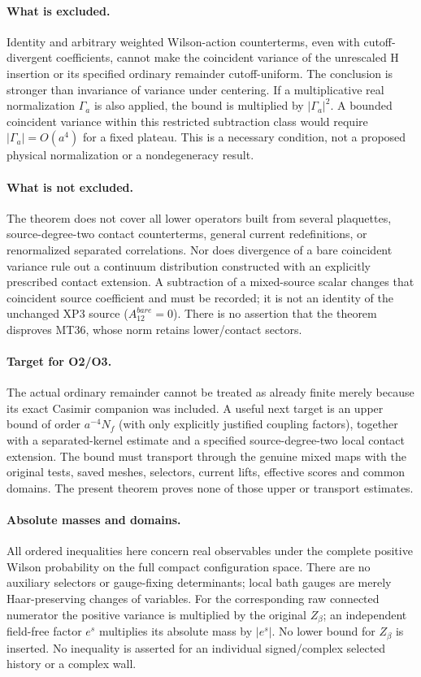 \documentclass[11pt]{article}
\begin{document}
\paragraph{What is excluded.}
Identity and arbitrary weighted Wilson-action counterterms, even with
cutoff-divergent coefficients, cannot make the coincident variance of the
unrescaled H insertion or its specified ordinary remainder cutoff-uniform.
The conclusion is stronger than invariance of variance under centering.
If a multiplicative real normalization $\Gamma_a$ is also applied, the
bound is multiplied by $|\Gamma_a|^2$. A bounded coincident variance within
this restricted subtraction class would require $|\Gamma_a|=O(a^4)$ for a
fixed plateau. This is a necessary condition, not a proposed physical
normalization or a nondegeneracy result.

\paragraph{What is not excluded.}
The theorem does not cover all lower operators built from several
plaquettes, source-degree-two contact counterterms, general current
redefinitions, or renormalized separated correlations. Nor does divergence
of a bare coincident variance rule out a continuum distribution constructed
with an explicitly prescribed contact extension. A subtraction of a
mixed-source scalar changes that coincident source coefficient and must be
recorded; it is not an identity of the unchanged XP3 source ($A_{12}^{bare}=0$).
There is no assertion that the theorem disproves MT36, whose norm retains
lower/contact sectors.

\paragraph{Target for O2/O3.}
The actual ordinary remainder cannot be treated as already finite merely
because its exact Casimir companion was included. A useful next target is
an upper bound of order $a^{-4}N_f$ (with only explicitly justified coupling
factors), together with a separated-kernel estimate and a specified
source-degree-two local contact extension. The bound must transport through
the genuine mixed maps with the original tests, saved meshes, selectors,
current lifts, effective scores and common domains. The present theorem
proves none of those upper or transport estimates.

\paragraph{Absolute masses and domains.}
All ordered inequalities here concern real observables under the complete
positive Wilson probability on the full compact configuration space. There
are no auxiliary selectors or gauge-fixing determinants; local bath gauges
are merely Haar-preserving changes of variables. For the corresponding
raw connected numerator the positive variance is multiplied by the original
$Z_\beta$; an independent field-free factor $e^s$ multiplies its absolute
mass by $|e^s|$. No lower bound for $Z_\beta$ is inserted. No inequality is
asserted for an individual signed/complex selected history or a complex wall.
\end{document}
